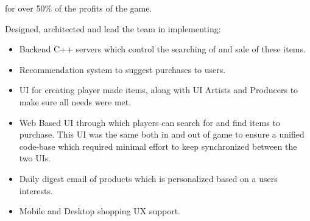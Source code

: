 \documentclass{article}
\begin{document}
for over 50\% of the profits of the game.
\par
\vspace{\baselineskip}
Designed, architected and lead the team in implementing: 
\begin{small}
\begin{itemize}
  \item Backend C++ servers which control the searching of and sale of these items.
  \item Recommendation system to suggest purchases to users.
  \item UI for creating player made items, along with UI Artists  and Producers to make sure all needs were met.
  \item Web Based UI through which players can search for and find items to purchase.  This UI was the same both in and out of game to ensure a unified code-base which required minimal effort to keep synchronized between the two UIs.
  \item Daily digest email of products which is personalized based on a users interests.
  \item Mobile and Desktop shopping UX support.
\end{itemize}
\end{small}
\end{document}
